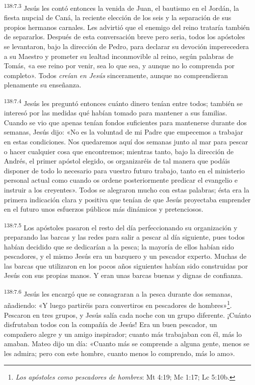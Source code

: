 \par
\textsuperscript{138:7.3} Jesús les contó entonces la venida de Juan, el bautismo en el Jordán, la fiesta nupcial de Caná, la reciente elección de los seis y la separación de sus propios hermanos carnales. Les advirtió que el enemigo del reino trataría también de separarlos. Después de esta conversación breve pero seria, todos los apóstoles se levantaron, bajo la dirección de Pedro, para declarar su devoción imperecedera a su Maestro y prometer su lealtad inconmovible al reino, según palabras de Tomás, «a ese reino por venir, sea lo que sea, y aunque no lo comprenda por completo». Todos \textit{creían en Jesús} sinceramente, aunque no comprendieran plenamente su enseñanza.

\par
\textsuperscript{138:7.4} Jesús les preguntó entonces cuánto dinero tenían entre todos; también se interesó por las medidas qué habían tomado para mantener a sus familias. Cuando se vio que apenas tenían fondos suficientes para mantenerse durante dos semanas, Jesús dijo: «No es la voluntad de mi Padre que empecemos a trabajar en estas condiciones. Nos quedaremos aquí dos semanas junto al mar para pescar o hacer cualquier cosa que encontremos; mientras tanto, bajo la dirección de Andrés, el primer apóstol elegido, os organizaréis de tal manera que podáis disponer de todo lo necesario para vuestro futuro trabajo, tanto en el ministerio personal actual como cuando os ordene posteriormente predicar el evangelio e instruir a los creyentes». Todos se alegraron mucho con estas palabras; ésta era la primera indicación clara y positiva que tenían de que Jesús proyectaba emprender en el futuro unos esfuerzos públicos más dinámicos y pretenciosos.

\par
\textsuperscript{138:7.5} Los apóstoles pasaron el resto del día perfeccionando su organización y preparando las barcas y las redes para salir a pescar al día siguiente, pues todos habían decidido que se dedicarían a la pesca; la mayoría de ellos habían sido pescadores, y el mismo Jesús era un barquero y un pescador experto. Muchas de las barcas que utilizaron en los pocos años siguientes habían sido construidas por Jesús con sus propias manos. Y eran unas barcas buenas y dignas de confianza.

\par
\textsuperscript{138:7.6} Jesús les encargó que se consagraran a la pesca durante dos semanas, añadiendo: «Y luego partiréis para convertiros en pescadores de hombres»\footnote{\textit{Los apóstoles como pescadores de hombres}: Mt 4:19; Mc 1:17; Lc 5:10b.}. Pescaron en tres grupos, y Jesús salía cada noche con un grupo diferente. ¡Cuánto disfrutaban todos con la compañía de Jesús! Era un buen pescador, un compañero alegre y un amigo inspirador; cuanto más trabajaban con él, más lo amaban. Mateo dijo un día: «Cuanto más se comprende a alguna gente, menos se les admira; pero con este hombre, cuanto menos lo comprendo, más lo amo».

